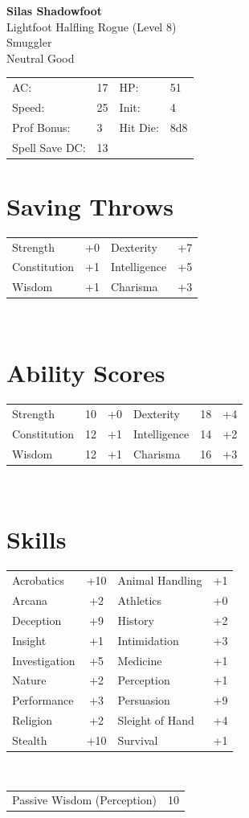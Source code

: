\documentclass{article}
\begin{document}
\thispagestyle{empty}
\begin{center}
\LARGE\textbf{Silas Shadowfoot}\\
\large Lightfoot Halfling Rogue (Level 8)\\
Smuggler\\
Neutral Good
\end{center}
\vspace{0.15in}
\begin{tabular}{ l l l l }
AC: & 17 & HP: & 51 \\
Speed: & 25 & Init: & 4 \\
Prof Bonus: & 3 & Hit Die: & 8d8 \\
Spell Save DC: & 13\\
\end{tabular}
\vspace{0.15in}
\section*{Saving Throws}
\begin{tabular}{ l c l c }
Strength & +0 & Dexterity & +7 \\
Constitution & +1 & Intelligence & +5 \\
Wisdom & +1 & Charisma & +3 \\
\end{tabular}
\\
\section*{Ability Scores}
\begin{tabular}{ l c c l c c }
Strength & 10 & +0 & Dexterity & 18 & +4 \\
Constitution & 12 & +1 & Intelligence & 14 & +2 \\
Wisdom & 12 & +1 & Charisma & 16 & +3 \\
\end{tabular}
\\
\section*{Skills}
\begin{tabular}{ l c l c }
Acrobatics & +10 & Animal Handling & +1 \\
Arcana & +2 & Athletics & +0 \\
Deception & +9 & History & +2 \\
Insight & +1 & Intimidation & +3 \\
Investigation & +5 & Medicine & +1 \\
Nature & +2 & Perception & +1 \\
Performance & +3 & Persuasion & +9 \\
Religion & +2 & Sleight of Hand & +4 \\
Stealth & +10 & Survival & +1 \\
\end{tabular}
\\
\begin{tabular}{ l c }
Passive Wisdom (Perception) & 10 \\
\end{tabular}
\\
\end{document}
